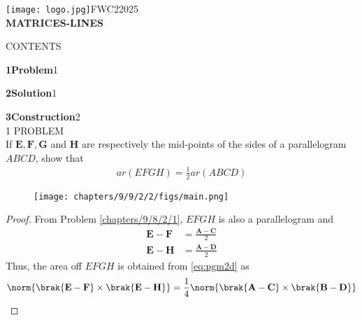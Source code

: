 \documentclass[a4paper,12pt]{report}
\let\vec\mathbf
\begin{document}
\raggedright{\texttt{[image: logo.jpg]}}\hspace{12.425cm}\raggedleft FWC22025\vspace{2mm}\\
\centering\Large\textbf{MATRICES-LINES}\vspace{5mm}
\begin{multicols}{2}
\centering \large\textsc{C}\footnotesize\textsc{ONTENTS}\vspace{5mm}\\
\raggedright\large\textbf{1\hspace{1cm}Problem}\hspace{5.18cm}1\vspace{5mm}\\
\raggedright\large\textbf{2\hspace{1cm}Solution}\hspace{5.25cm}1\vspace{5mm}\\
\raggedright\large\textbf{3\hspace{1cm}Construction}\hspace{4.27cm}2\vspace{5mm}\\
\centering \large\textsc{1  P}\footnotesize\textsc{ROBLEM}\vspace{5mm}\\
\fi
If $\vec{E}, \vec{F}, \vec{G}$ and $\vec{H}$  are respectively the mid-points of the sides of a parallelogram  $ABCD$, show that
	\begin{align}
ar(EFGH) =\frac{1}{2} ar(ABCD)
		\label{eq:9/9/2/2/}
	\end{align}
	\begin{figure}[H]
		\centering
 \texttt{[image: chapters/9/9/2/2/figs/main.png]}
		\caption{}
		\label{fig:9/9/2/2}
  	\end{figure}
	  \begin{proof}
		  From Problem 
\ref{chapters/9/8/2/1}, $EFGH$ is also a parallelogram and 
	\begin{align}
		\vec{E}-\vec{F} &= 
		\frac{\vec{A}-\vec{C}}{2}  
		\\
		\vec{E}-\vec{H} &= 
		\frac{\vec{A}-\vec{D}}{2}  
	\end{align}
	Thus, the area off $EFGH$ is obtained from  
  \eqref{eq:pgm2d} as
	\begin{align}
		\norm{	\brak{\vec{E}-\vec{F}}\times 
		\brak{	\vec{E}-\vec{H}  }} = \frac{1}{4}
\norm{
		\brak{\vec{A}-\vec{C}}  
		\times
		\brak{\vec{B}-\vec{D}}}  

\end{align}
\end{proof}
\end{multicols}
\end{document}
